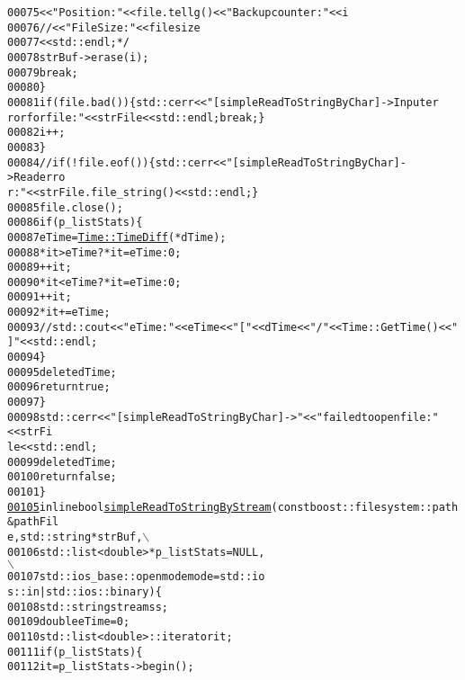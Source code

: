 \begin{footnotesize}
\begin{alltt}
00075 \textcolor{comment}{                    <<"Position: "<<file.tellg()<<"Backup counter:"<<i}
00076 \textcolor{comment}{                    //<<"FileSize:"<<filesize}
00077 \textcolor{comment}{                    <<std::endl;*/}
00078                     strBuf->erase(i);
00079                     \textcolor{keywordflow}{break};
00080                 \}
00081                 \textcolor{keywordflow}{if} (file.bad())\{ std::cerr<<\textcolor{stringliteral}{"[simpleReadToStringByChar]->Input er
      ror for file: "}<<strFile<<std::endl; \textcolor{keywordflow}{break};\}
00082                 i++;
00083             \}
00084             \textcolor{comment}{//if (!file.eof())\{ std::cerr<<"[simpleReadToStringByChar]->Read erro
      r: "<<strFile.file\_string()<<std::endl; \}}
00085             file.close();
00086             \textcolor{keywordflow}{if} (p\_listStats)\{
00087                 eTime = \hyperlink{group__libbuskol_gac6d1980cc97a5c78f36a3fd96ceaa573}{Time::TimeDiff}( *dTime );
00088                 *it > eTime ? *it = eTime : 0;
00089                 ++it;
00090                 *it < eTime ? *it = eTime : 0;
00091                 ++it;
00092                 *it += eTime;
00093                 \textcolor{comment}{//std::cout<<"eTime:"<<eTime<<"["<<dTime<<"/"<<Time::GetTime()<<"
      ]"<<std::endl;}
00094             \}
00095             \textcolor{keyword}{delete} dTime;
00096             \textcolor{keywordflow}{return} \textcolor{keyword}{true};
00097         \}
00098         std::cerr<<\textcolor{stringliteral}{"[simpleReadToStringByChar]->"}<<\textcolor{stringliteral}{"failed to open file: "}<<strFi
      le<<std::endl;
00099         \textcolor{keyword}{delete} dTime;
00100         \textcolor{keywordflow}{return} \textcolor{keyword}{false};
00101     \}
\hypertarget{myIO_8hpp_source_l00105}{}\hyperlink{group__libbuskol_gac962eb969ccaa2b77a024a28c3c2b702}{00105}     \textcolor{keyword}{inline} \textcolor{keywordtype}{bool} \hyperlink{group__libbuskol_gac962eb969ccaa2b77a024a28c3c2b702}{simpleReadToStringByStream}(\textcolor{keyword}{const} boost::filesystem::path &pathFil
      e, std::string *strBuf,\(\backslash\)
00106                                            std::list<double> *p\_listStats = NULL,
      \(\backslash\)
00107                                            std::ios\_base::openmode mode = std::io
      s::in|std::ios::binary)\{
00108         std::stringstream ss;
00109         \textcolor{keywordtype}{double} eTime = 0;
00110         std::list<double>::iterator it;
00111         \textcolor{keywordflow}{if}(p\_listStats)\{
00112             it = p\_listStats->begin();

\end{alltt}
\end{footnotesize}
